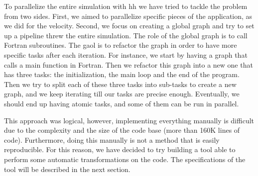 To parallelize the entire simulation with \gls{hh} we have tried to tackle the
problem from two sides. First, we aimed to parallelize specific pieces of the
application, as we did for the velocity. Second, we focus on creating a global
graph and try to set up a pipeline threw the entire simulation. The role of the
global graph is to call Fortran subroutines. The gaol is to refactor the graph
in order to have more specific tasks after each iteration. For instance, we
start by having a graph that calls a main function in Fortran. Then we refactor
this graph into a new one that has three tasks: the initialization, the main
loop and the end of the program. Then we try to split each of these three tasks
into sub-tasks to create a new graph, and we keep iterating till our tasks are
precise enough. Eventually, we should end up having atomic tasks, and some of
them can be run in parallel.

This approach was logical, however, implementing everything manually is
difficult due to the complexity and the size of the code base (more than 160K
lines of code). Furthermore, doing this manually is not a method that is easily
reproducible. For this reason, we have decided to try building a tool able to
perform some automatic transformations on the code. The specifications of the
tool will be described in the next section.
